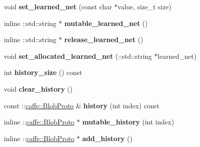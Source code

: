 \begin{DoxyCompactItemize}
\mbox{\label{classcaffe_1_1_solver_state_a55d82f294c937f525af37cbe700bacfe}} 
void {\bfseries set\+\_\+learned\+\_\+net} (const char $\ast$value, size\+\_\+t size)
\item 
\mbox{\label{classcaffe_1_1_solver_state_a91874289fae751c4f852a0dd28160d84}} 
inline \+::std\+::string $\ast$ {\bfseries mutable\+\_\+learned\+\_\+net} ()
\item 
\mbox{\label{classcaffe_1_1_solver_state_a0182e8ade41bb79ac320d1d00b97d785}} 
inline \+::std\+::string $\ast$ {\bfseries release\+\_\+learned\+\_\+net} ()
\item 
\mbox{\label{classcaffe_1_1_solver_state_a86f38356d11853faeb96d32ab955002d}} 
void {\bfseries set\+\_\+allocated\+\_\+learned\+\_\+net} (\+::std\+::string $\ast$learned\+\_\+net)
\item 
\mbox{\label{classcaffe_1_1_solver_state_a16fc88ec1f35a1ff6be93ec0489383f7}} 
int {\bfseries history\+\_\+size} () const
\item 
\mbox{\label{classcaffe_1_1_solver_state_ad98f3aa6b948cad80da8fd72570877a2}} 
void {\bfseries clear\+\_\+history} ()
\item 
\mbox{\label{classcaffe_1_1_solver_state_a60d05abf9828a0046f1eaa648391bd42}} 
const \+::\mbox{\hyperlink{classcaffe_1_1_blob_proto}{caffe\+::\+Blob\+Proto}} \& {\bfseries history} (int index) const
\item 
\mbox{\label{classcaffe_1_1_solver_state_a5b952eed605c873cc22c04d5d67e0165}} 
inline \+::\mbox{\hyperlink{classcaffe_1_1_blob_proto}{caffe\+::\+Blob\+Proto}} $\ast$ {\bfseries mutable\+\_\+history} (int index)
\item 
\mbox{\label{classcaffe_1_1_solver_state_a8b844663a9133a645c50ea3c7443154b}} 
inline \+::\mbox{\hyperlink{classcaffe_1_1_blob_proto}{caffe\+::\+Blob\+Proto}} $\ast$ {\bfseries add\+\_\+history} ()
\item 
\mbox{\label{classcaffe_1_1_solver_state_a74a5b018086114c116f49ff48b3b2261}} 

\end{DoxyCompactItemize}
